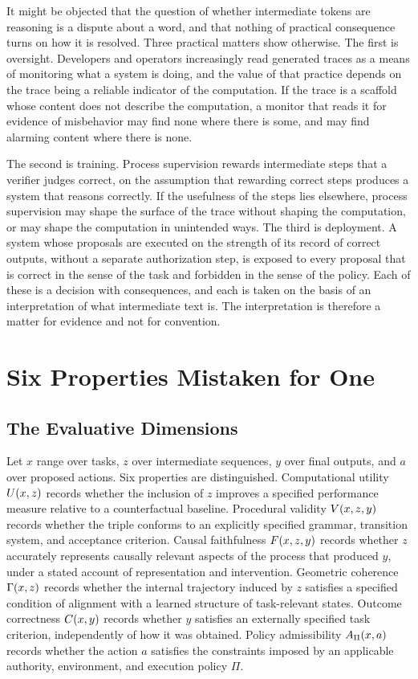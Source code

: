 It might be objected that the question of whether intermediate tokens are reasoning is a dispute about a word, and that nothing of practical consequence turns on how it is resolved. Three practical matters show otherwise. The first is oversight. Developers and operators increasingly read generated traces as a means of monitoring what a system is doing, and the value of that practice depends on the trace being a reliable indicator of the computation. If the trace is a scaffold whose content does not describe the computation, a monitor that reads it for evidence of misbehavior may find none where there is some, and may find alarming content where there is none.

The second is training. Process supervision rewards intermediate steps that a verifier judges correct, on the assumption that rewarding correct steps produces a system that reasons correctly. If the usefulness of the steps lies elsewhere, process supervision may shape the surface of the trace without shaping the computation, or may shape the computation in unintended ways. The third is deployment. A system whose proposals are executed on the strength of its record of correct outputs, without a separate authorization step, is exposed to every proposal that is correct in the sense of the task and forbidden in the sense of the policy. Each of these is a decision with consequences, and each is taken on the basis of an interpretation of what intermediate text is. The interpretation is therefore a matter for evidence and not for convention.

\chapter{Six Properties Mistaken for One}
\label{ch:properties}

\section{The Evaluative Dimensions}

Let $x$ range over tasks, $z$ over intermediate sequences, $y$ over final outputs, and $a$ over proposed actions. Six properties are distinguished. Computational utility $U(x,z)$ records whether the inclusion of $z$ improves a specified performance measure relative to a counterfactual baseline. Procedural validity $V(x,z,y)$ records whether the triple conforms to an explicitly specified grammar, transition system, and acceptance criterion. Causal faithfulness $F(x,z,y)$ records whether $z$ accurately represents causally relevant aspects of the process that produced $y$, under a stated account of representation and intervention. Geometric coherence $\Gamma(x,z)$ records whether the internal trajectory induced by $z$ satisfies a specified condition of alignment with a learned structure of task-relevant states. Outcome correctness $C(x,y)$ records whether $y$ satisfies an externally specified task criterion, independently of how it was obtained. Policy admissibility $A_\Pi(x,a)$ records whether the action $a$ satisfies the constraints imposed by an applicable authority, environment, and execution policy $\Pi$.

